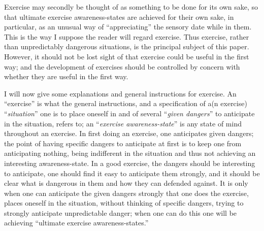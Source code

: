 Exercise may secondly be thought of as something to be done for its own 
sake, so that ultimate exercise awareness-states are achieved for their own 
sake, in particular, as an unusual way of \enquote{appreciating} the sensory date 
while in them. This is the way I suppose the reader will regard exercise. Thus 
exercise, rather than unpredictably dangerous situations, is the principal 
subject of this paper. However, it should not be lost sight of that exercise 
could be useful in the first way; and the development of exercises should be 
controlled by concern with whether they are useful in the first way. 

I will now give some explanations and general instructions for exercise. 
An \enquote{exercise} is what the general instructions, and a specification of a(n 
exercise) \enquote{\emph{situation}} one is to place oneself in and of several 
\enquote{\emph{given dangers}} to anticipate in the situation, refers to;
an \enquote{\emph{exercise awareness-state}} 
is any state of mind throughout an exercise. In first doing an exercise, one 
anticipates given dangers; the point of having specific dangers to anticipate 
at first is to keep one from anticipating nothing, being indifferent in the 
situation and thus not achieving an interesting awareness-state. In a good 
exercise, the dangers should be interesting to anticipate, one should find it 
easy to anticipate them strongly, and it should be clear what is dangerous 
in them and how they can defended against. It is only when one can 
anticipate the given dangers strongly that one does the exercise, places 
oneself in the situation, without thinking of specific dangers, trying to
strongly anticipate unpredictable danger; when one can do this one will be 
achieving \enquote{ultimate exercise awareness-states.} 

